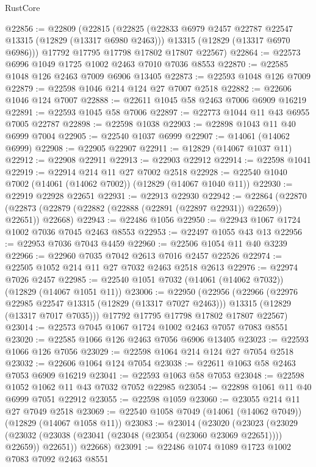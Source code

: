 \begin{lexlean}{RustCore}
\begin{coremodule}
@22856 := @22809
    (@22815
      (@22825
        (@22833 @6979 @2457 @22787 @22547 @13315 (@12829 (@13317 @6980 @2463)))
        @13315
        (@12829 (@13317 @6970 @6986)))
      @17792
      @17795
      @17798
      @17802
      @17807
      @22567)
@22864 := @22573 @6996 @1049 @1725 @1002 @2463 @7010 @7036 @8553
@22870 := @22585 @1048 @126 @2463 @7009 @6906 @13405
@22873 := @22593 @1048 @126 @7009
@22879 := @22598 @1046 @214 @124 @27 @7007 @2518
@22882 := @22606 @1046 @124 @7007
@22888 := @22611 @1045 @58 @2463 @7006 @6909 @16219
@22891 := @22593 @1045 @58 @7006
@22897 := @22773 @1044 @11 @43 @6955 @7005 @22787
@22898 := @22598 @1038
@22903 := @22898 @1043 @11 @40 @6999 @7004
@22905 := @22540 @1037 @6999
@22907 := @14061 (@14062 @6999)
@22908 := @22905 @22907
@22911 := @12829 (@14067 @1037 @11)
@22912 := @22908 @22911
@22913 := @22903 @22912
@22914 := @22598 @1041
@22919 := @22914 @214 @11 @27 @7002 @2518
@22928 := @22540 @1040 @7002 (@14061 (@14062 @7002)) (@12829 (@14067 @1040 @11))
@22930 := @22919 @22928 @22651
@22931 := @22913 @22930
@22942 := @22864
    (@22870 (@22873 (@22879 (@22882 (@22888 (@22891 (@22897 @22931)) @22659)) @22651)) @22668)
@22943 := @22486 @1056
@22950 := @22943 @1067 @1724 @1002 @7036 @7045 @2463 @8553
@22953 := @22497 @1055 @43 @13
@22956 := @22953 @7036 @7043 @4459
@22960 := @22506 @1054 @11 @40 @3239
@22966 := @22960 @7035 @7042 @2613 @7016 @2457 @22526
@22974 := @22505 @1052 @214 @11 @27 @7032 @2463 @2518 @2613
@22976 := @22974 @7026 @2457
@22985 := @22540 @1051 @7032 (@14061 (@14062 @7032)) (@12829 (@14067 @1051 @11))
@23006 := @22950
    (@22956
      (@22966
        (@22976 @22985 @22547 @13315 (@12829 (@13317 @7027 @2463)))
        @13315
        (@12829 (@13317 @7017 @7035)))
      @17792
      @17795
      @17798
      @17802
      @17807
      @22567)
@23014 := @22573 @7045 @1067 @1724 @1002 @2463 @7057 @7083 @8551
@23020 := @22585 @1066 @126 @2463 @7056 @6906 @13405
@23023 := @22593 @1066 @126 @7056
@23029 := @22598 @1064 @214 @124 @27 @7054 @2518
@23032 := @22606 @1064 @124 @7054
@23038 := @22611 @1063 @58 @2463 @7053 @6909 @16219
@23041 := @22593 @1063 @58 @7053
@23048 := @22598 @1052 @1062 @11 @43 @7032 @7052 @22985
@23054 := @22898 @1061 @11 @40 @6999 @7051 @22912
@23055 := @22598 @1059
@23060 := @23055 @214 @11 @27 @7049 @2518
@23069 := @22540 @1058 @7049 (@14061 (@14062 @7049)) (@12829 (@14067 @1058 @11))
@23083 := @23014
    (@23020
      (@23023
        (@23029 (@23032 (@23038 (@23041 (@23048 (@23054 (@23060 @23069 @22651)))) @22659)) @22651))
      @22668)
@23091 := @22486 @1074 @1089 @1723 @1002 @7083 @7092 @2463 @8551

\end{coremodule}
\end{lexlean}
